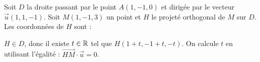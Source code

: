 \begin{question}

Soit $D$ la droite passant par le point $A(1,-1,0)$ et dirigée par le vecteur $\vec{u}(1,1,-1)$. Soit $M(1,-1,3)$ un point et $H$ le projeté orthogonal de $M$ sur $D$. Les coordonnées de $H$ sont : 
\begin{answers}


 
    
    
\end{answers}
\begin{explanations}
$H\in D$, donc il existe $t \in \mathbb{R}$ tel que $H(1+t,-1+t,-t)$. On calcule $t$ en utilisant l'égalité : $\overrightarrow{HM} \cdot \vec{u} = 0$.
\end{explanations}

\end{question}


